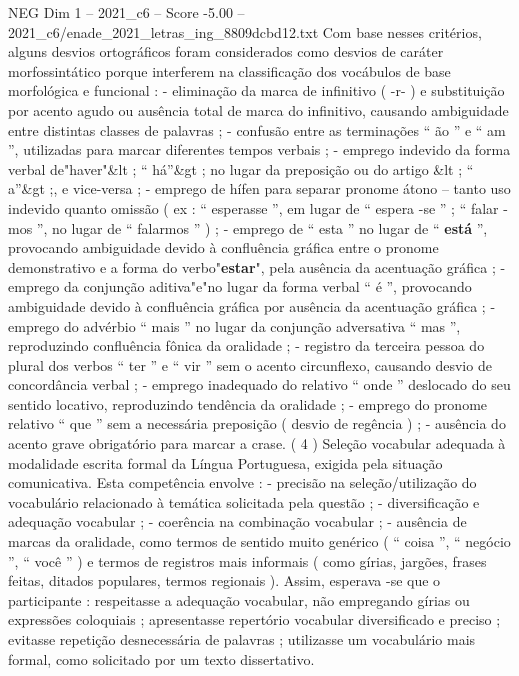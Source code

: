 \begin{textsample}{NEG Dim 1 – 2021\_c6 – Score -5.00 – 2021\_c6/enade\_2021\_letras\_ing\_8809dcbd12.txt}
Com base nesses critérios, alguns desvios ortográficos foram considerados como desvios de caráter morfossintático porque interferem na classificação dos vocábulos de base morfológica e funcional : - eliminação da marca de infinitivo ( -r- ) e substituição por acento agudo ou ausência total de marca do infinitivo, causando ambiguidade entre distintas classes de palavras ; - confusão entre as terminações “ ão ” e “ am ”, utilizadas para marcar diferentes tempos verbais ; - emprego indevido da forma verbal de"haver"\&lt ; “ há”\&gt ; no lugar da preposição ou do artigo \&lt ; “ a”\&gt ;, e vice-versa ; - emprego de hífen para separar pronome átono – tanto uso indevido quanto omissão ( ex : “ esperasse ”, em lugar de “ espera -se ” ; “ falar -mos ”, no lugar de “ falarmos ” ) ; - emprego de “ esta ” no lugar de “ \textbf{está} ”, provocando ambiguidade devido à confluência gráfica entre o pronome demonstrativo e a forma do verbo"\textbf{estar}", pela ausência da acentuação gráfica ; - emprego da conjunção aditiva"e"no lugar da forma verbal “ é ”, provocando ambiguidade devido à confluência gráfica por ausência da acentuação gráfica ; - emprego do advérbio “ mais ” no lugar da conjunção adversativa “ mas ”, reproduzindo confluência fônica da oralidade ; - registro da terceira pessoa do plural dos verbos “ ter ” e “ vir ” sem o acento circunflexo, causando desvio de concordância verbal ; - emprego inadequado do relativo “ onde ” deslocado do seu sentido locativo, reproduzindo tendência da oralidade ; - emprego do pronome relativo “ que ” sem a necessária preposição ( desvio de regência ) ; - ausência do acento grave obrigatório para marcar a crase. ( 4 ) Seleção vocabular adequada à modalidade escrita formal da Língua Portuguesa, exigida pela situação comunicativa.
Esta competência envolve : - precisão na seleção/utilização do vocabulário relacionado à temática solicitada pela questão ; - diversificação e adequação vocabular ; - coerência na combinação vocabular ; - ausência de marcas da oralidade, como termos de sentido muito genérico ( “ coisa ”, “ negócio ”, “ você ” ) e termos de registros mais informais ( como gírias, jargões, frases feitas, ditados populares, termos regionais ).
Assim, esperava -se que o participante : respeitasse a adequação vocabular, não empregando gírias ou expressões coloquiais ; apresentasse repertório vocabular diversificado e preciso ; evitasse repetição desnecessária de palavras ; utilizasse um vocabulário mais formal, como solicitado por um texto dissertativo.

\end{textsample}
